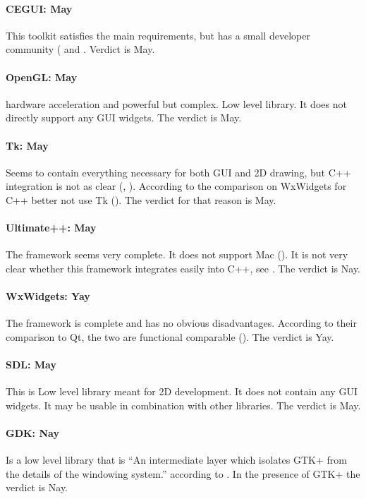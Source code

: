\paragraph{CEGUI: May} This toolkit satisfies the main requirements, but has a
small developer community (\cite{wiki:cegui} and \cite{cegui:cegui}. Verdict is May.
 

\paragraph{OpenGL: May} hardware acceleration and powerful but complex. Low
level library. It does not directly support any GUI widgets. The verdict is
May.

\paragraph{Tk: May} Seems to contain everything necessary for both GUI and 2D
drawing, but C++ integration is not as clear (\cite{wiki:tk}, \cite{tcltk:tk}).
According to the comparison on WxWidgets for C++ better not use Tk
(\cite{wxwidget:comparison}).  The verdict for that reason is May.

\paragraph{Ultimate++: May} The framework seems very complete. It does not
support Mac (\cite{wxwidget:comparison}).  It is not very clear whether this
framework integrates easily into C++, see \cite{u++:ultimate++}. The verdict is
Nay.

\paragraph{WxWidgets: Yay} The framework is complete and has no obvious
disadvantages. According to their comparison to Qt, the two are functional
comparable (\cite{wxwidget:comparison}).  The verdict is Yay.

\paragraph{SDL: May} This is Low level library meant for 2D development. It
does not contain any GUI widgets. It may be usable in combination with other
libraries. The verdict is May.

\paragraph{GDK: Nay} Is a low level library that is ``An intermediate layer
which isolates GTK+ from the details of the windowing system.'' according to
\cite{gnome:gdk3}. In the presence of GTK+ the verdict is Nay.


